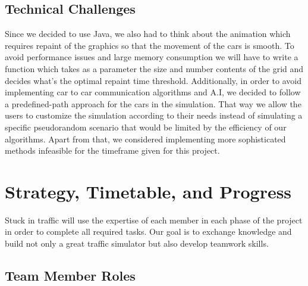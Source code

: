 \documentclass[oneside]{article}
\begin{document}
\subsection{Technical Challenges}
Since we decided to use Java, we also had to think about the animation which requires repaint of the graphics so that the movement of the cars is smooth. To avoid performance issues and large memory consumption we will have to write a function which takes as a parameter the size and number contents of the grid and decides what's the optimal repaint time threshold. Additionally, in order to avoid implementing car to car communication algorithms and A.I, we decided to follow a predefined-path approach for the cars in the simulation. That way we allow the users to customize the simulation according to their needs instead of simulating a specific pseudorandom scenario that would be limited by the efficiency of our algorithms. Apart from that, we considered implementing more sophisticated methods infeasible for the timeframe given for this project.



\section{Strategy, Timetable, and Progress}

\noindent Stuck in traffic will use the expertise of each member in each phase of the project in order to complete all required tasks. Our goal is to exchange knowledge and build not only a great traffic simulator but also develop teamwork skills. %

\subsection{Team Member Roles}
\end{document}

